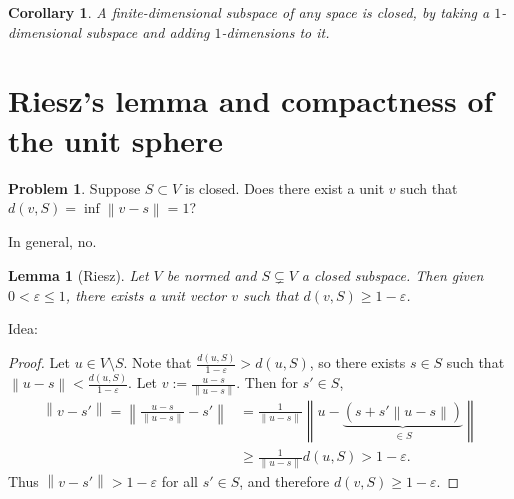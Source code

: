 \documentclass[12pt]{article}
\newcommand{\norm}[1]{\left\| #1 \right\|}
\newtheorem{lma}[thm]{Lemma}
\newtheorem{cor}[thm]{Corollary}
\theoremstyle{definition}
\newtheorem{prob}[thm]{Problem}
\begin{document}
\begin{cor}
	A finite-dimensional subspace of any space is closed, by taking a $1$-di\-men\-sion\-al subspace and adding $1$-di\-men\-sions to it.
\end{cor}

\section{Riesz's lemma and compactness of the unit sphere}

\begin{prob}
	Suppose $S \subset V$ is closed.
	Does there exist a unit $v$ such that $d(v,S) = \inf \norm{v - s} = 1$?
\end{prob}
\noindent In general, no.

\begin{lma}[Riesz]
	Let $V$ be normed and $S \subsetneq V$ a closed subspace.
	Then given $0 < \varepsilon \leq 1$, there exists a unit vector $v$ such that $d(v,S) \geq 1 - \varepsilon$.
\end{lma}
\noindent Idea:
\begin{center}
\end{center}

\begin{proof}
	Let $u \in V \setminus S$.
	Note that $\frac{d(u,S)}{1-\varepsilon} > d(u,S)$, so there exists $s \in S$ such that $\norm{u - s} < \frac{d(u,S)}{1-\varepsilon}$.
	Let $v := \frac{u-s}{\norm{u-s}}$.
	Then for $s' \in S$,
	\begin{align*}
		\norm{v - s'} = \norm{\frac{u-s}{\norm{u-s}} - s'}
		&= \frac{1}{\norm{u-s}} \norm{u - \underbrace{\left( s + s' \norm{u-s} \right)}_{\in S}} \\
		&\geq \frac{1}{\norm{u-s}} d(u,S) > 1 - \varepsilon.
	\end{align*}
	Thus $\norm{v - s'} > 1 - \varepsilon$ for all $s' \in S$, and therefore $d(v,S) \geq 1 - \varepsilon$.
\end{proof}
\end{document}

